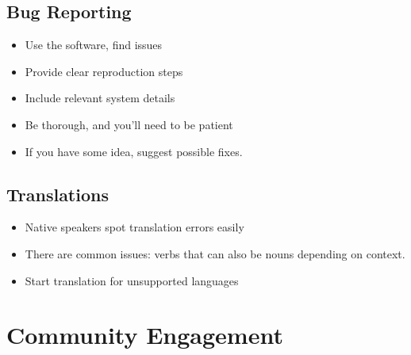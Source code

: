 \documentclass{presentacion}
\begin{document}
\subsection{Bug Reporting}
\begin{frame}
    \begin{itemize}[<+->]
        \item Use the software, find issues
        \item Provide clear reproduction steps
        \item Include relevant system details
        \item Be thorough, and you'll need to be patient
        \item If you have some idea, suggest possible fixes.
    \end{itemize}  
    
    \vspace{1em}
\end{frame}

\subsection{Translations}
\begin{frame}
    \begin{itemize}[<+->]
        \item Native speakers spot translation errors easily
        \item There are common issues: verbs that can also be nouns depending on context.
        \item Start translation for unsupported languages
    \end{itemize}
    
    \vspace{1em}
\end{frame}

\section{Community Engagement}
\end{document}
